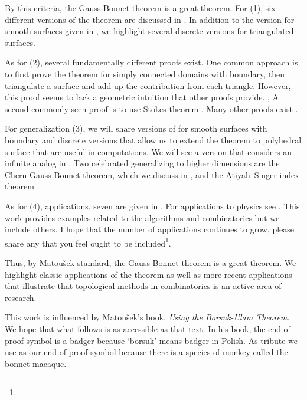 By this criteria, the Gauss-Bonnet theorem is a great theorem.
For (1), six different versions of the theorem are discussed
in \cite{wu_historical_2008}. 
In addition to the version for smooth surfaces given in ,
we highlight several discrete versions for triangulated surfaces. 
 
 
 
As for (2), several fundamentally different proofs exist.  
One common approach is to first prove the theorem for simply connected domains
with boundary, then triangulate a surface and add up the contribution from each triangle.
However, this proof seems to lack a geometric intuition that other proofs provide. \cite{wu_historical_2008},
A second commonly seen proof is to use Stokes theorem  \cite{doc76,pressley_elementary_2010}.
Many other proofs exist \cite{guillemin_differential_2010,levi-bicycle,grinfeld_introduction_2013,li_gauss-bonnet-chern_2011}.


For generalization (3), we will share versions of  for smooth
surfaces with boundary and discrete versions that allow us to extend the theorem to 
polyhedral surface that are useful in computations. We will see a version that considers
an infinite analog  in .
Two  celebrated generalizing  to higher dimensions are the Chern-Gauss-Bonnet theorem\cite{chern_simple_1944}, which we
discuss in , and
the Atiyah–Singer index theorem  \cite{atiyah_index_1963}.




As for (4), applications, 
seven are given in \cite{doc76}.
For applications to physics see \cite{tirado-physics-apps,gibbons_applications_2008}.
This work provides examples related to the algorithms and combinatorics but we include
others.
I hope that the number of applications continues to grow,
please share any that you feel
ought to be included\footnote{}.

Thus, by Matou\v{s}ek standard, the Gauss-Bonnet theorem is a great theorem.
We highlight classic applications of the theorem as well as more recent
applications that illustrate that topological methods in combinatorics is an active
area of research.

This work is influenced by Matou\v{s}ek's book, \emph{Using the Borsuk-Ulam Theorem}.
We hope that what follows is as accessible as that text. In his book, the end-of-proof symbol is
a badger because `borsuk' means badger in Polish. As tribute we use \macaque as 
our end-of-proof symbol because there is a species of monkey called the bonnet macaque.



